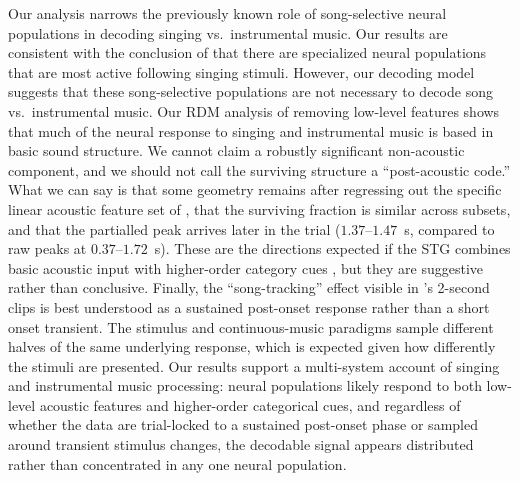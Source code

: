 \documentclass[11pt]{article}
\begin{document}
Our analysis narrows the previously known role of song-selective neural populations in decoding singing vs.\ instrumental music. Our results are consistent with the conclusion of \citet{NormanHaignere2022} that there are specialized neural populations that are most active following singing stimuli. However, our decoding model suggests that these song-selective populations are not necessary to decode song vs.\ instrumental music. Our RDM analysis of removing low-level features shows that much of the neural response to singing and instrumental music is based in basic sound structure. We cannot claim a robustly significant non-acoustic component, and we should not call the surviving structure a ``post-acoustic code.'' What we can say is that some geometry remains after regressing out the specific linear acoustic feature set of \citet{NormanHaignere2022}, that the surviving fraction is similar across subsets, and that the partialled peak arrives later in the trial ($1.37$--$1.47$~s, compared to raw peaks at $0.37$--$1.72$~s). These are the directions expected if the STG combines basic acoustic input with higher-order category cues \citep{BhayaGrossman2022,Hullett2016,Mesgarani2014,Yi2019,Leonard2024,Sankaran2024}, but they are suggestive rather than conclusive. Finally, the ``song-tracking'' effect visible in \citet{NormanHaignere2022}'s 2-second clips is best understood as a sustained post-onset response rather than a short onset transient. The stimulus and continuous-music paradigms sample different halves of the same underlying response, which is expected given how differently the stimuli are presented. Our results support a multi-system account of singing and instrumental music processing: neural populations likely respond to both low-level acoustic features and higher-order categorical cues, and regardless of whether the data are trial-locked to a sustained post-onset phase or sampled around transient stimulus changes, the decodable signal appears distributed rather than concentrated in any one neural population.
\end{document}
